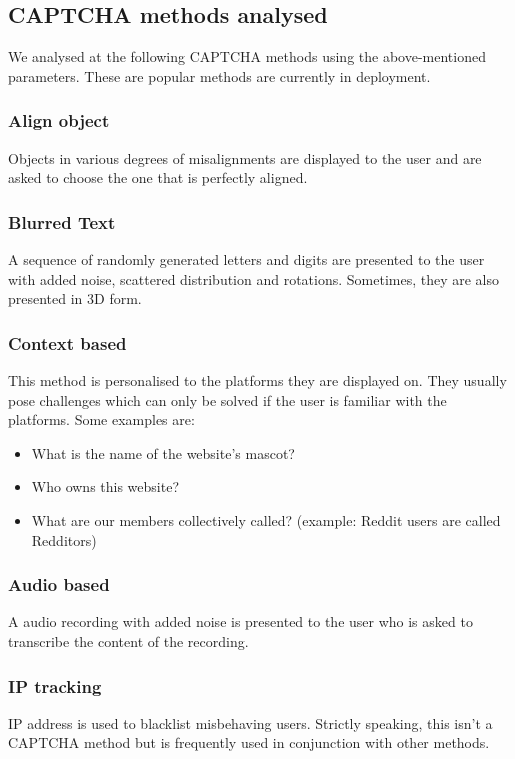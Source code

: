 \subsection{CAPTCHA methods analysed}
We analysed at the following CAPTCHA methods using the above-mentioned
parameters. These are popular methods are currently in deployment.

\subsubsection{Align object}
Objects in various degrees of misalignments are displayed to the user and are
asked to choose the one that is perfectly aligned.

\subsubsection{Blurred Text}
A sequence of randomly generated letters and digits are 
		presented to the user with added noise, scattered distribution and
		rotations. Sometimes, they are also presented in 3D form. 

\subsubsection{Context based}
This method is personalised to the platforms they are displayed on. They usually
pose challenges which can only be solved if the user is familiar with the
platforms. Some examples are:
	\begin{itemize}
		\item What is the name of the website's mascot?  
		\item Who owns this website?
		\item What are our members collectively called? (example: Reddit users are
			called Redditors)
	\end{itemize}

\subsubsection{Audio based}
A audio recording with added noise is presented to the user who is asked to
transcribe the content of the recording.

\subsubsection{IP tracking}
IP address is used to blacklist misbehaving users. Strictly speaking, this isn't
a CAPTCHA method but is frequently used in conjunction with other methods.

